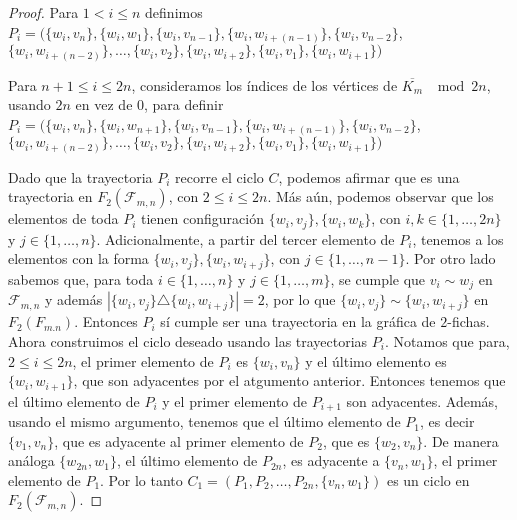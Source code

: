 \begin{proof}
    Para $1 < i \leq n$ definimos
    $P_i=(\{w_i,v_n\},\{w_i,w_1\},\{w_i,v_{n-1}\},\{w_i,w_{i+(n-1)}\},\{w_i,v_{n-2}\}$,
    $\{w_i,w_{i+(n-2)}\},\dots,\{w_i,v_2\},\{w_i,w_{i+2}\},\{w_i,v_1\},\{w_i,w_{i+1}\})$

    Para $n+1\leq i \leq 2n$, consideramos los \'indices de los v\'ertices de
    $\overline{K_m}$ $\mod 2n$, usando $2n$ en vez de $0$, para definir
    $P_i=(\{w_i,v_n\},\{w_i,w_{n+1}\},\{w_i,v_{n-1}\},\{w_i,w_{i+(n-1)}\},\{w_i,v_{n-2}\}$,
    $\{w_i,w_{i+(n-2)}\},\dots,
    \{w_i,v_2\},\{w_i,w_{i+2}\},\{w_i,v_1\},\{w_i,w_{i+1}\})$

    Dado que la trayectoria $P_i$ recorre el ciclo $C$, podemos afirmar que es
    una trayectoria en $F_2(\mathcal{F}_{m,n})$, con $2\leq i \leq 2n$. M\'as a\'un,
    podemos observar que los elementos de toda $P_i$ tienen configuraci\'on
    $\{w_i,v_j\},\{w_i,w_k\}$, con $i, k\in \{1, \dots, 2n\}$ y $j \in \{1,
    \dots, n\}$. Adicionalmente, a partir del tercer elemento de $P_i$, tenemos a
    los elementos con la forma $\{w_i,v_j\},\{w_i,w_{i+j}\}$, con $j \in \{1,
    \dots, n-1\}$.  Por otro lado sabemos que, para toda $i \in \{1, \dots, n\}$
    y $j \in \{1, \dots, m\}$, se cumple que $v_i \sim w_j$ en $\mathcal{F}_{m,n}$ y
    adem\'as $|\{w_i,v_j\} \triangle \{w_i, w_{i+j}\}|=2$, por lo que
    $\{w_i,v_j\} \sim \{w_i, w_{i+j}\}$ en $F_2(F_{m.n})$. Entonces $P_i$ s\'i
    cumple ser una trayectoria en la gr\'afica de $2$-fichas. Ahora construimos
    el ciclo deseado usando las trayectorias $P_i$. Notamos que para, $2 \leq i
    \leq 2n$, el primer elemento de $P_i$ es $\{w_i, v_n\}$ y el \'ultimo
    elemento es $\{w_i, w_{i+1}\}$, que son adyacentes por el atgumento
    anterior. Entonces tenemos que el \'ultimo elemento de $P_i$ y el primer
    elemento de $P_{i+1}$ son adyacentes. Adem\'as, usando el mismo argumento,
    tenemos que el \'ultimo elemento de $P_1$, es decir $\{v_1,v_n\}$, que es
    adyacente al primer elemento de $P_2$, que es $\{w_2,v_n\}$. De manera
    an\'aloga $\{w_{2n},w_1\}$, el \'ultimo elemento de $P_{2n}$, es adyacente a
    $\{v_n,w_1\}$, el primer elemento de $P_1$. Por lo tanto $C_1 = (P_1,P_2,
    \dots, P_{2n},\{v_n,w_1\})$ es un ciclo en $F_2(\mathcal{F}_{m,n})$. 


\end{proof}
